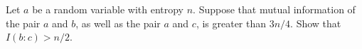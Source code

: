 Let $a$ be a random variable with entropy $n$. Suppose that mutual information of the pair $a$ and $b$,
as well as the pair $a$ and $c$, is greater than $3n / 4$. Show that $I(b : c) > n / 2$.
